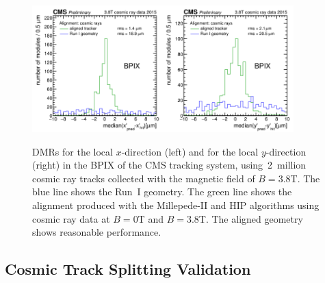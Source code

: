 \begin{figure}[htb]
    \begin{center}
        \includegraphics[width=0.45\textwidth]{../figs/Alignment/AlRes_CRAFT_DmedianR_BPIX_plain.png}\includegraphics[width=0.45\textwidth]{../figs/Alignment/AlRes_CRAFT_DmedianYR_BPIX_plain.png}
    \end{center}
    \caption {DMRs for the local $x$-direction (left) and for the local $y$-direction (right) in the BPIX of the CMS tracking system, using~2~million cosmic ray tracks collected with the magnetic field of $B=$3.8T. The blue line shows the Run~I geometry. The green line shows the alignment produced with the Millepede-II and HIP algorithms using cosmic ray data at $B=$0T and $B=$3.8T. The aligned geometry shows reasonable performance.}
    \label{fig:DMRs}
\end{figure}

\clearpage

\subsection{Cosmic Track Splitting Validation}
\label{sec:AlRes_trackSplit}

